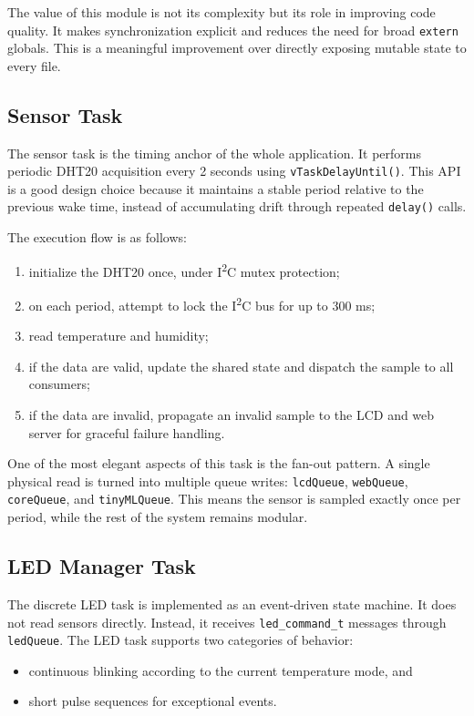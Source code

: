 The value of this module is not its complexity but its role in improving code
quality. It makes synchronization explicit and reduces the need for broad
\texttt{extern} globals. This is a meaningful improvement over directly
exposing mutable state to every file.

\subsection{Sensor Task}
The sensor task is the timing anchor of the whole application. It performs
periodic DHT20 acquisition every 2 seconds using \texttt{vTaskDelayUntil()}.
This API is a good design choice because it maintains a stable period relative
to the previous wake time, instead of accumulating drift through repeated
\texttt{delay()} calls.

The execution flow is as follows:
\begin{enumerate}
  \item initialize the DHT20 once, under I\textsuperscript{2}C mutex
  protection;
  \item on each period, attempt to lock the I\textsuperscript{2}C bus for up to
  300 ms;
  \item read temperature and humidity;
  \item if the data are valid, update the shared state and dispatch the sample
  to all consumers;
  \item if the data are invalid, propagate an invalid sample to the LCD and web
  server for graceful failure handling.
\end{enumerate}

One of the most elegant aspects of this task is the fan-out pattern. A single
physical read is turned into multiple queue writes:
\texttt{lcdQueue}, \texttt{webQueue}, \texttt{coreQueue}, and
\texttt{tinyMLQueue}. This means the sensor is sampled exactly once per period,
while the rest of the system remains modular.

\subsection{LED Manager Task}
The discrete LED task is implemented as an event-driven state machine. It does
not read sensors directly. Instead, it receives \texttt{led\_command\_t}
messages through \texttt{ledQueue}. The LED task supports two categories of
behavior:
\begin{itemize}
  \item continuous blinking according to the current temperature mode, and
  \item short pulse sequences for exceptional events.
\end{itemize}

